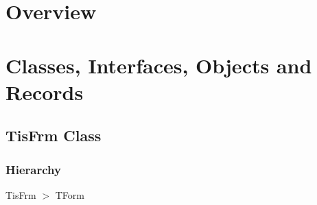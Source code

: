 \documentclass{report}
\newif\ifpdf
\begin{document}
\section{Overview}
\begin{description}
\item[\texttt{\begin{ttfamily}TisFrm\end{ttfamily} Class}]
\end{description}
\section{Classes, Interfaces, Objects and Records}
\ifpdf
\subsection*{\large{\textbf{TisFrm Class}}\normalsize\hspace{1ex}\hrulefill}
\else
\subsection*{TisFrm Class}
\fi
\label{thinstall.TisFrm}
\subsubsection*{\large{\textbf{Hierarchy}}\normalsize\hspace{1ex}\hfill}
TisFrm {$>$} TForm
\end{document}
